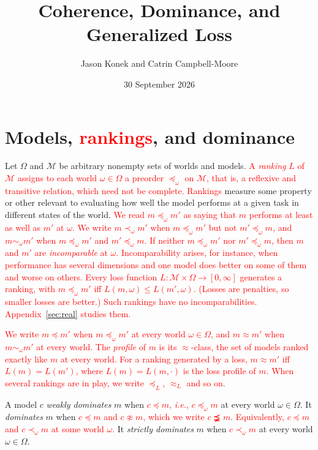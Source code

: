 \documentclass[11pt]{article}
\title{Coherence, Dominance, and Generalized Loss}
\author{Jason Konek and Catrin Campbell-Moore}
\date{30 September 2026}
\theoremstyle{definition}
\theoremstyle{remark}
\newcommand{\M}{\mathcal M}
\begin{document}
\maketitle



\section{Models, \textcolor{red}{rankings}, and dominance}\label{sec:setting}
Let $\Omega$ and $\M$ be arbitrary nonempty sets of worlds and models. \textcolor{red}{A \emph{ranking} $L$ of $\M$ assigns to each world $\omega\in\Omega$ a preorder $\preceq_\omega$ on $\M$, that is, a reflexive and transitive relation, which need not be complete.} \textcolor{red}{Rankings} measure some property or other relevant to evaluating how well the model performs at a given task in different states of the world. \textcolor{red}{We read $m\preceq_\omega m'$ as saying that $m$ performs at least as well as $m'$ at $\omega$. We write $m\prec_\omega m'$ when $m\preceq_\omega m'$ but not $m'\preceq_\omega m$, and $m\sim_\omega m'$ when $m\preceq_\omega m'$ and $m'\preceq_\omega m$. If neither $m\preceq_\omega m'$ nor $m'\preceq_\omega m$, then $m$ and $m'$ are \emph{incomparable} at $\omega$. Incomparability arises, for instance, when performance has several dimensions and one model does better on some of them and worse on others. Every loss function $L:\M\times\Omega\to[0,\infty]$ generates a ranking, with $m\preceq_\omega m'$ iff $L(m,\omega)\le L(m',\omega)$. (Losses are penalties, so smaller losses are better.) Such rankings have no incomparabilities. Appendix~\ref{sec:real} studies them.}

\textcolor{red}{We write $m\preceq m'$ when $m\preceq_\omega m'$ at every world $\omega\in\Omega$, and $m\approx m'$ when $m\sim_\omega m'$ at every world. The \emph{profile} of $m$ is its $\approx$-class, the set of models ranked exactly like $m$ at every world. For a ranking generated by a loss, $m\approx m'$ iff $L(m)=L(m')$, where $L(m)=L(m,\cdot)$ is the loss profile of $m$. When several rankings are in play, we write $\preceq_L$, $\approx_L$ and so on.}

A model $c$ \emph{weakly dominates} $m$ when \textcolor{red}{$c\preceq m$, \textit{i.e.}, $c\preceq_\omega m$} at every world $\omega\in\Omega$. It \emph{dominates} $m$ when \textcolor{red}{$c\preceq m$ and $c\not\approx m$, which we write $c\precneqq m$. Equivalently, $c\preceq m$ and $c\prec_\omega m$ at some world $\omega$.} It \emph{strictly dominates} $m$ when \textcolor{red}{$c\prec_\omega m$} at every world $\omega\in\Omega$.
\end{document}
